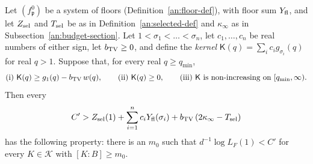 \begin{proposition}\label{an:signed}
Let $(f^0_{\mathfrak p})$ be a system of floors (Definition~\ref{an:floor-def}),
with floor sum $Y_{\rm fl}$, and let $Z_{\rm sel}$ and $T_{\rm sel}$ be as in
Definition~\ref{an:selected-def} and $\kappa_\infty$ as in
Subsection~\ref{an:budget-section}.
Let $1<\sigma_1<\dots<\sigma_n$, let $c_1,\dots,c_n$ be real numbers of
either sign, let $b_{\rm TV}\ge0$, and define the \emph{kernel}
$\mathsf K(q)=\sum_ic_ig_{\sigma_i}(q)$ for real $q>1$. Suppose that, for
every real $q\ge q_{\min}$,
\[
 \text{(i) }\mathsf K(q)\ge g_1(q)-b_{\rm TV}\,w(q),\qquad
 \text{(ii) }\mathsf K(q)\ge0,\qquad
 \text{(iii) }\mathsf K\text{ is non-increasing on }[q_{\min},\infty).
\]
Then every
\[
 C'>Z_{\rm sel}(1)+\sum_{i=1}^nc_iY_{\rm fl}(\sigma_i)
 +b_{\rm TV}\,(2\kappa_\infty-T_{\rm sel})
\]
has the following property: there is an $m_0$ such that
$d^{-1}\log L_F(1)<C'$ for every $K\in\mathcal K$ with $[K:B]\ge m_0$.
\end{proposition}

